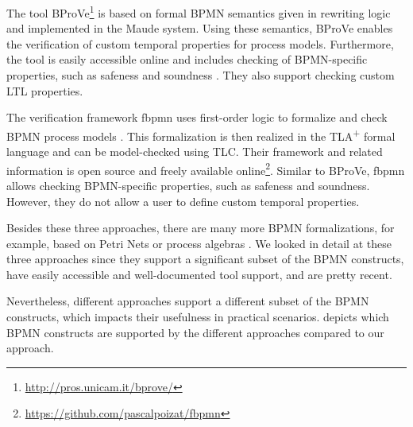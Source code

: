 \documentclass[adraft, copyright, creativecommons]{eptcs} %
\begin{document}
The tool BProVe\footnote{\url{http://pros.unicam.it/bprove/}} is based on formal BPMN semantics given in rewriting logic and implemented in the Maude system.
Using these semantics, BProVe enables the verification of custom temporal properties for process models.
Furthermore, the tool is easily accessible online and includes checking of BPMN-specific properties, such as safeness and soundness \cite{corradiniFormalApproachAnalysis2021}.
They also support checking custom LTL properties.

The verification framework \textsf{fbpmn} uses first-order logic to formalize and check BPMN process models \cite{houhouFirstOrderLogicVerification2022}.
This formalization is then realized in the TLA\textsuperscript{+} formal language and can be model-checked using TLC.
Their framework and related information is open source and freely available online\footnote{\url{https://github.com/pascalpoizat/fbpmn}}.
Similar to BProVe, \textsf{fbpmn} allows checking BPMN-specific properties, such as safeness and soundness.
However, they do not allow a user to define custom temporal properties.

Besides these three approaches, there are many more BPMN formalizations, for example, based on Petri Nets \cite{dijkmanSemanticsAnalysisBusiness2008} or process algebras \cite{wongProcessSemanticsBPMN2008}.
We looked in detail at these three approaches since they support a significant subset of the BPMN constructs, have easily accessible and well-documented tool support, and are pretty recent.

Nevertheless, different approaches support a different subset of the BPMN constructs, which impacts their usefulness in practical scenarios.
 depicts which BPMN constructs are supported by the different approaches compared to our approach.
\end{document}
